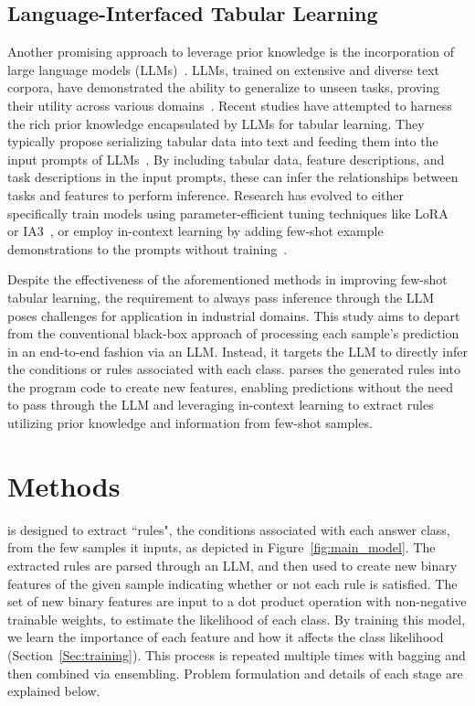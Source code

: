 \documentclass{article}
\theoremstyle{plain}
\theoremstyle{definition}
\theoremstyle{remark}
\begin{document}
\subsection{Language-Interfaced Tabular Learning}
Another promising approach to leverage prior knowledge is the incorporation of large language models (LLMs)~\cite{anil2023palm,openai2023gpt4}. LLMs, trained on extensive and diverse text corpora, have demonstrated the ability to generalize to unseen tasks, proving their utility across various domains~\cite{brown2020language}. Recent studies have attempted to harness the rich prior knowledge encapsulated by LLMs for tabular learning. They typically propose serializing tabular data into text and feeding them into the input prompts of LLMs~\cite{dinh2022lift,hegselmann2023tabllm,wang2023anypredict}. By including tabular data, feature descriptions, and task descriptions in the input prompts, these can infer the relationships between tasks and features to perform inference. Research has evolved to either specifically train models using parameter-efficient tuning techniques like LoRA~\cite{hu2021lora} or IA3~\cite{liu2022few}, or employ in-context learning by adding few-shot example demonstrations to the prompts without training~\cite{dinh2022lift,hegselmann2023tabllm,nam2023semi,slack2023tablet}.

Despite the effectiveness of the aforementioned methods in improving few-shot tabular learning, the requirement to always pass inference through the LLM poses challenges for application in industrial domains. This study aims to depart from the conventional black-box approach of processing each sample's prediction in an end-to-end fashion via an LLM. Instead, it targets the LLM to directly infer the conditions or rules associated with each class. \model{} parses the generated rules into the program code to create new features, enabling predictions without the need to pass through the LLM and leveraging in-context learning to extract rules utilizing prior knowledge and information from few-shot samples. 


\section{Methods}
\model{} is designed to extract ``rules", the conditions associated with each answer class, from the few samples it inputs, as depicted in Figure~\ref{fig:main_model}. The extracted rules are parsed through an LLM, and then used to create new binary features of the given sample indicating whether or not each rule is satisfied. The set of new binary features are input to a dot product operation with non-negative trainable weights, to estimate the likelihood of each class. By training this model, we learn the importance of each feature and how it affects the class likelihood (Section~\ref{Sec:training}). This process is repeated multiple times with bagging and then combined via ensembling. Problem formulation and details of each stage are explained below. 
\end{document}
